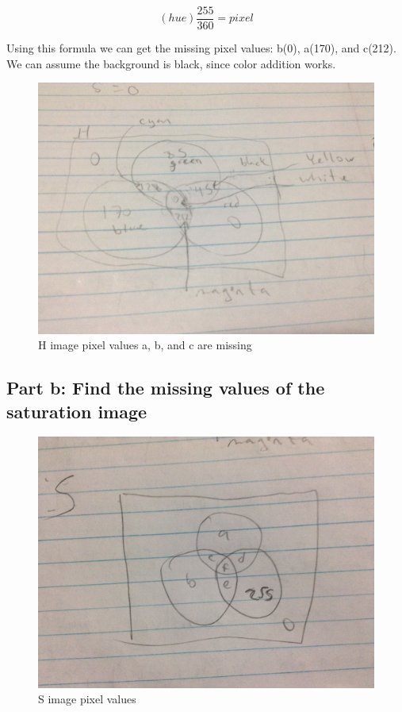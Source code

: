 \documentclass{article}
\begin{document}
	\[(hue)\frac{255}{360} = pixel\]
	
	Using this formula we can get the missing pixel values: b(0), a(170), and c(212).
	We can assume the background is black, since color addition works.
	
	\begin{figure}[H]
		\includegraphics[width=\linewidth]{6.16/fig2.JPG}
		\caption{H image pixel values a, b, and c are missing}
	\end{figure}
	
	\subsection{Part b: Find the missing values of the saturation image}
	
	\begin{figure}[H]
		\includegraphics[width=\linewidth]{6.16/fig3.JPG}
		\caption{S image pixel values}
	\end{figure}
	
\end{document}
